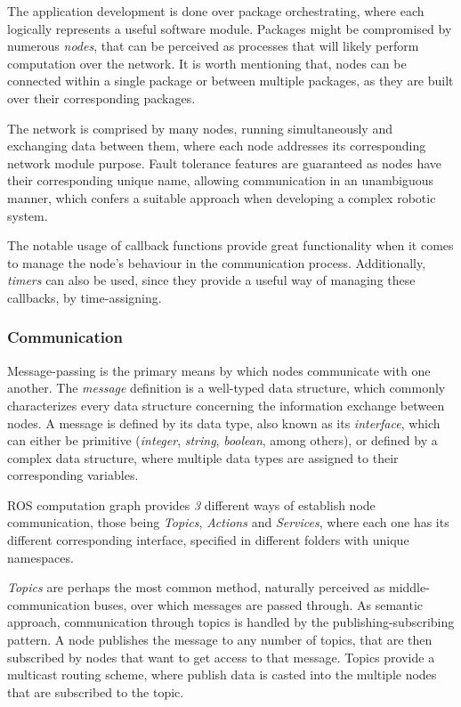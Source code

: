 The application development is done over package orchestrating, where each logically represents a useful software module. Packages might be compromised by numerous \textit{nodes}, that can be perceived as processes that will likely perform computation over the network. It is worth mentioning that, nodes can be connected within a single package or between multiple packages, as they are built over their corresponding packages. \cite{cousins2010welcome, intro-ros}

The network is comprised by many nodes, running simultaneously and exchanging data between them, where each node addresses its corresponding network module purpose. \cite{ros2documentation} Fault tolerance features are guaranteed as nodes have their corresponding unique name, allowing communication in an unambiguous manner, which confers a suitable approach when developing a complex robotic system.

The notable usage of callback functions provide great functionality when it comes to manage the node's behaviour in the communication process. Additionally, \textit{timers} can also be used, since they provide a useful way of managing these callbacks, by time-assigning.

\subsubsection{Communication}

Message-passing is the primary means by which nodes communicate with one another. The \textit{message} definition is a well-typed data structure, which commonly characterizes every data structure concerning the information exchange between nodes. A message is defined by its data type, also known as its \textit{interface}, which can either be primitive (\textit{integer}, \textit{string}, \textit{boolean}, among others), or defined by a complex data structure, where multiple data types are assigned to their corresponding variables. \cite{ros2documentation, intro-ros}

ROS computation graph provides \textit{3} different ways of establish node communication, those being \textit{Topics}, \textit{Actions} and \textit{Services}, where each one has its different corresponding interface, specified in different folders with unique namespaces. \cite{ros2documentation}

\textit{Topics} are perhaps the most common method, naturally perceived as middle-communication buses, over which messages are passed through. As semantic approach, communication through topics is handled by the publishing-subscribing pattern. A node publishes the message to any number of topics, that are then subscribed by nodes that want to get access to that message. Topics provide a multicast routing scheme, where publish data is casted into the multiple nodes that are subscribed to the topic. \cite{casini2019response}

